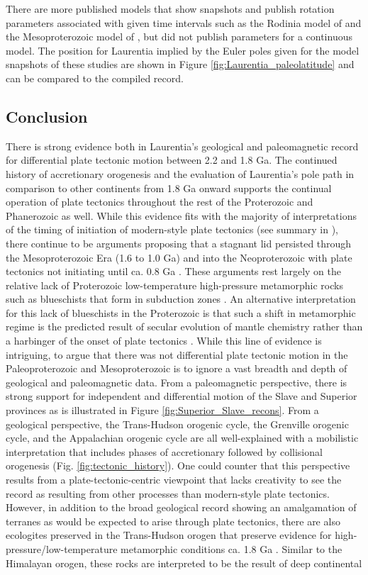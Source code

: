 \documentclass[11pt,letterpaper]{article}
\begin{document}
There are more published models that show snapshots and publish rotation parameters associated with given time intervals such as the Rodinia model of \cite{Li2008a} and the Mesoproterozoic model of \cite{Pisarevsky2014b}, but did not publish parameters for a continuous model. The position for Laurentia implied by the Euler poles given for the model snapshots of these studies are shown in Figure \ref{fig:Laurentia_paleolatitude} and can be compared to the compiled record. 

\subsection{Conclusion}

There is strong evidence both in Laurentia's geological and paleomagnetic record for differential plate tectonic motion between 2.2 and 1.8 Ga. The continued history of accretionary orogenesis and the evaluation of Laurentia's pole path in comparison to other continents from 1.8 Ga onward supports the continual operation of plate tectonics throughout the rest of the Proterozoic and Phanerozoic as well. While this evidence fits with the majority of interpretations of the timing of initiation of modern-style plate tectonics (see summary in \citealp{Korenaga2013a}), there continue to be arguments proposing that a stagnant lid persisted through the Mesoproterozoic Era (1.6 to 1.0 Ga) and into the Neoproterozoic  with plate tectonics not initiating until ca. 0.8 Ga \citep{Hamilton2011a, Stern2018a}. These arguments rest largely on the relative lack of Proterozoic low-temperature high-pressure metamorphic rocks such as blueschists that form in subduction zones \citep{Stern2013a}. An alternative interpretation for this lack of blueschists in the Proterozoic is that such a shift in metamorphic regime is the predicted result of secular evolution of mantle chemistry rather than a harbinger of the onset of plate tectonics \citep{Palin2015a}. While this line of evidence is intriguing, to argue that there was not differential plate tectonic motion in the Paleoproterozoic and Mesoproterozoic is to ignore a vast breadth and depth of geological and paleomagnetic data. From a paleomagnetic perspective, there is strong support for independent and differential motion of the Slave and Superior provinces as is illustrated in Figure \ref{fig:Superior_Slave_recons}. From a geological perspective, the Trans-Hudson orogenic cycle, the Grenville orogenic cycle, and the Appalachian orogenic cycle are all well-explained with a mobilistic interpretation that includes phases of accretionary followed by collisional orogenesis (Fig. \ref{fig:tectonic_history}). One could counter that this perspective results from a plate-tectonic-centric viewpoint that lacks creativity to see the record as resulting from other processes than modern-style plate tectonics. However, in addition to the broad geological record showing an amalgamation of terranes as would be expected to arise through plate tectonics, there are also ecologites preserved in the Trans-Hudson orogen that preserve evidence for high-pressure/low-temperature metamorphic conditions ca. 1.8 Ga \citep{Weller2017a}. Similar to the Himalayan orogen, these rocks are interpreted to be the result of deep continental 
\end{document}
